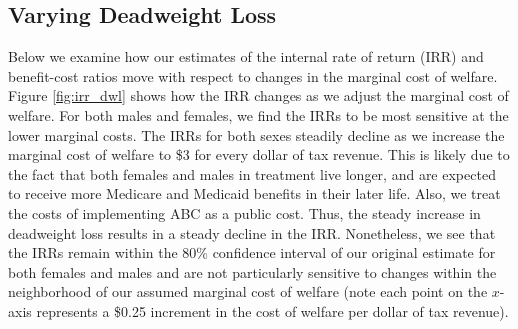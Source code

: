 \subsection{Varying Deadweight Loss}

\noindent Below we examine how our estimates of the internal rate of return (IRR) and benefit-cost
ratios move with respect to changes in the marginal cost of welfare. \\

\noindent Figure \ref{fig:irr_dwl} shows how the IRR changes as we adjust
the marginal cost of welfare. For both males and females, we find the IRRs
to be most sensitive at the lower marginal costs. The IRRs for both sexes
steadily decline as we increase the marginal cost of welfare to \$3 for every dollar
of tax revenue. This is likely due
to the fact that both females and males in treatment live longer, and are expected to 
receive more Medicare and Medicaid benefits in their later life. 
Also, we treat the costs of implementing ABC as a public cost. 
Thus, the steady increase in deadweight loss results in a 
steady decline in the IRR. Nonetheless, we see that the IRRs 
remain within the 80\% confidence interval of our original estimate 
for both females and males and are not particularly sensitive to changes within the 
neighborhood of our assumed marginal cost of welfare (note each point on the $x$-axis
represents a \$0.25 increment in the cost of welfare per dollar of tax revenue). 


